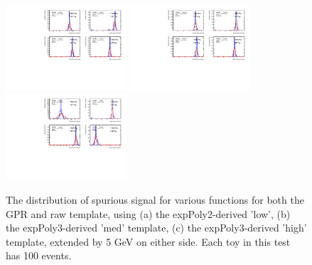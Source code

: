 \begin{figure} 
\begin{center}
  \includegraphics[width=0.4\textwidth]{figures/background/gpr/validation/padded/ToyTest_FitSigVals_lowpT_100_noSig}   
  \includegraphics[width=0.4\textwidth]{figures/background/gpr/validation/padded/ToyTest_FitSigVals_medpT_100_noSig}   
  \includegraphics[width=0.4\textwidth]{figures/background/gpr/validation/padded/ToyTest_FitSigVals_highpT_100_noSig}   
\caption{The distribution of spurious signal for various functions for both the GPR and raw template, using (a) the expPoly2-derived 'low', (b) the expPoly3-derived 'med' template, (c) the expPoly3-derived 'high' template, extended by 5 GeV on either side. Each toy in this test has 100 events.}
\label{fig:padded_lowpt_100_noSig}
\end{center}
\end{figure}

